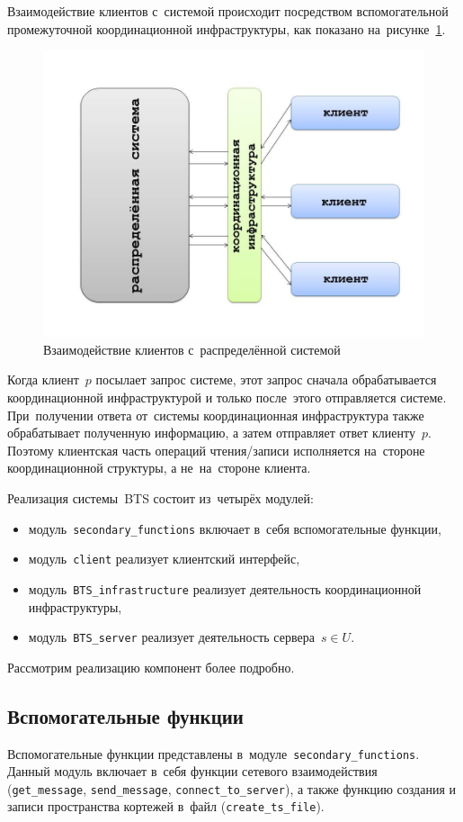 Взаимодействие клиентов с~системой происходит посредством вспомогательной промежуточной координационной инфраструктуры, как показано на~рисунке~\ref{clser}.
\begin{figure}[H]
	\centering \includegraphics[width=0.7 \textwidth, height=0.5 \textwidth]{img/ClientServer}  \caption{Взаимодействие клиентов с~распределённой системой} \label{clser}
\end{figure}
Когда клиент~$p$ посылает запрос системе, этот запрос сначала обрабатывается координационной инфраструктурой и только после~этого отправляется системе. При~получении ответа от~системы координационная инфраструктура также обрабатывает полученную информацию, а затем отправляет ответ клиенту~$p$. Поэтому клиентская часть операций чтения/записи исполняется на~стороне координационной структуры, а не~на~стороне клиента.

Реализация системы~BTS состоит из~четырёх модулей:
\begin{itemize}
	\item модуль~\texttt{secondary\_functions} включает в~себя вспомогательные функции,
	\item модуль~\texttt{client} реализует клиентский интерфейс,
	\item модуль~\texttt{BTS\_infrastructure} реализует деятельность координационной инфраструктуры,
	\item модуль~\texttt{BTS\_server} реализует деятельность сервера~$s \in U$.
\end{itemize}
Рассмотрим реализацию компонент более подробно.


\subsection{Вспомогательные функции}\label{subsec:2}
Вспомогательные функции представлены в~модуле~\texttt{secondary\_functions}. Данный модуль включает в~себя функции сетевого взаимодействия (\texttt{get_message}, \texttt{send_message}, \texttt{connect_to_server}), а также функцию создания и записи пространства кортежей в~файл (\texttt{create_ts_file}).

